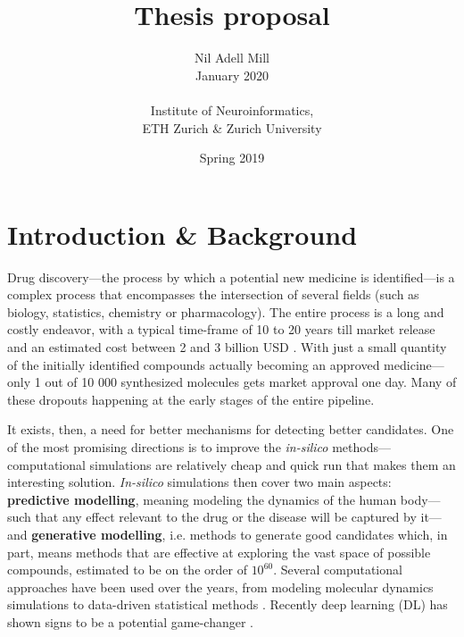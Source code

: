 \documentclass{article}
\begin{document}
\title{\Large Thesis proposal}
\author{Nil Adell Mill \\
        January 2020 \\ \\
        Institute of Neuroinformatics, \\
        ETH Zurich \& Zurich University}
\date{Spring 2019}

\maketitle

    \section*{Introduction \& Background}  

Drug discovery---the process by which a potential new medicine is identified---is a
 complex process that encompasses the intersection of several fields (such as biology,
 statistics, chemistry or pharmacology). The entire process is a long and costly
 endeavor, with a typical time-frame of 10 to 20 years till market release and an
 estimated cost between 2 and 3 billion USD \cite{Schneider2019, Scannell2012}. With
 just a small quantity of the initially identified compounds actually becoming an
 approved medicine—only 1 out of 10 000 synthesized molecules gets market approval one
 day. Many of these dropouts happening at the early stages of the entire pipeline.

It exists, then, a need for better mechanisms for detecting better candidates. One of
 the most promising directions is to improve the \emph{in-silico}
 methods---computational simulations are relatively cheap and quick run that makes them
 an interesting solution. \emph{In-silico} simulations then cover two main aspects:
 \textbf{predictive modelling}, meaning modeling the dynamics of the human body---such
 that any effect relevant to the drug or the disease will be captured by it---and
 \textbf{generative modelling}, i.e. methods to generate good candidates which, in part,
 means methods that are effective at exploring the vast space of possible compounds,
 estimated to be on the order of $10^{60}$\cite{Reymond2012}. Several computational
 approaches have been used over the years, from modeling molecular dynamics simulations
 to data-driven statistical methods \cite{Hung2014, Kuhn2016}. Recently deep learning
 (DL) has shown signs to be a potential game-changer \cite{Dargan2019}. 


\end{document}

